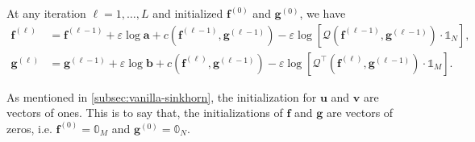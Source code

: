 \begin{update}\label{update:log-sinkhorn}
  At any iteration $\ell = 1, \ldots, L$ and initialized $\mathbf{f}^{(0)}$ and $\mathbf{g}^{(0)}$, we have
  \begin{equation}\label{eqn:log-sinkhorn-update}
    \begin{aligned}
      \mathbf{f}^{(\ell)}
       & = \mathbf{f}^{(\ell-1)} + \varepsilon\log \mathbf{a} + c \left(\mathbf{f}^{(\ell-1)}, \mathbf{g}^{(\ell-1)}\right)
      -\varepsilon\log
      \left[
        \mathcal{Q} \left(
        \mathbf{f}^{(\ell-1)}, \mathbf{g}^{(\ell-1)}
        \right)\cdot \mathbb{1}_N
      \right],                                                                                                              \\
      \mathbf{g}^{(\ell)}
       & = \mathbf{g}^{(\ell-1)} + \varepsilon\log \mathbf{b} + c \left(\mathbf{f}^{(\ell)}, \mathbf{g}^{(\ell-1)}\right)
      -\varepsilon\log
      \left[
        \mathcal{Q}^\top \left(\mathbf{f}^{(\ell)}, \mathbf{g}^{(\ell-1)}\right) \cdot \mathbb{1}_M
        \right].
    \end{aligned}
  \end{equation}
\end{update}

\begin{remark}[]
  As mentioned in \cref{subsec:vanilla-sinkhorn}, the initialization for $\mathbf{u}$ and $\mathbf{v}$ are vectors of ones.
  This is to say that, the initializations of $\mathbf{f}$ and $\mathbf{g}$ are vectors of zeros,
  i.e. $\mathbf{f}^{(0)} = \mathbb{0}_M$ and $\mathbf{g}^{(0)} = \mathbb{0}_N$.
\end{remark}






